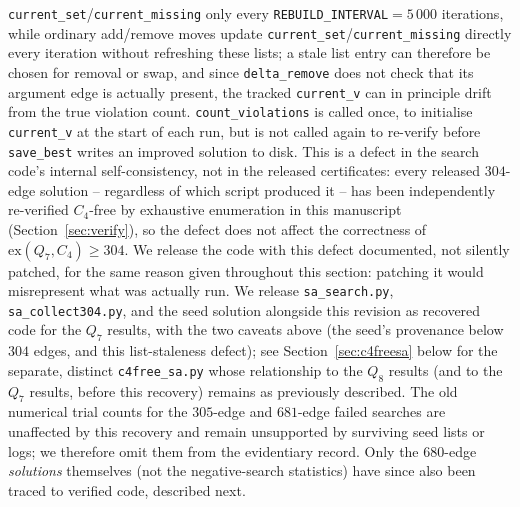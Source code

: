 \documentclass[12pt,a4paper]{article}
\theoremstyle{definition}
\newcommand{\ex}{\mathrm{ex}}
\begin{document}
\texttt{current\_set}/\texttt{current\_missing} only every
\texttt{REBUILD\_INTERVAL}$=5\,000$ iterations, while ordinary
add/remove moves update \texttt{current\_set}/\texttt{current\_missing}
directly every iteration without refreshing these lists; a stale list
entry can therefore be chosen for removal or swap, and since
\texttt{delta\_remove} does not check that its argument edge is
actually present, the tracked \texttt{current\_v} can in principle
drift from the true violation count. \texttt{count\_violations} is
called once, to initialise \texttt{current\_v} at the start of each
run, but is not called again to re-verify before \texttt{save\_best}
writes an improved solution to disk. This is a defect in the search
code's internal self-consistency, not in the released certificates:
every released $304$-edge solution -- regardless of which script
produced it -- has been independently re-verified $C_4$-free by
exhaustive enumeration in this manuscript (Section~\ref{sec:verify}),
so the defect does not affect the correctness of
$\ex(Q_7,C_4)\ge304$. We release the code with this defect documented,
not silently patched, for the same reason given throughout this
section: patching it would misrepresent what was actually run. We
release \texttt{sa\_search.py}, \texttt{sa\_collect304.py}, and the
seed solution alongside this revision as recovered
code for the $Q_7$ results, with the two caveats above (the seed's
provenance below $304$ edges, and this list-staleness defect); see Section~\ref{sec:c4freesa} below for
the separate, distinct \texttt{c4free\_sa.py} whose relationship to
the $Q_8$ results (and to the $Q_7$ results, before this recovery)
remains as previously described. The old numerical trial counts for the $305$-edge and $681$-edge failed
searches are unaffected by this recovery and remain unsupported by surviving
seed lists or logs; we therefore omit them from the evidentiary record. Only
the $680$-edge \emph{solutions} themselves (not the negative-search
statistics) have since also been traced to verified code, described next.
\end{document}
